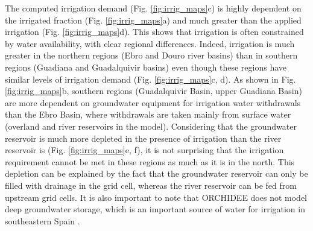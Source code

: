 The computed irrigation demand (Fig. \ref{fig:irrig_maps}c) is highly dependent on the irrigated fraction (Fig. \ref{fig:irrig_maps}a) and much greater than the applied irrigation (Fig. \ref{fig:irrig_maps}d). This shows that irrigation is often constrained by water availability, with clear regional differences. Indeed, irrigation is much greater in the northern regions (Ebro and Douro river basins) than in southern regions (Guadiana and Guadalquivir basins) even though these regions have similar levels of irrigation demand (Fig. \ref{fig:irrig_maps}c, d).
As shown in Fig. \ref{fig:irrig_maps}b, southern regions (Guadalquivir Basin, upper Guadiana Basin) are more dependent on groundwater equipment for irrigation water withdrawals than the Ebro Basin, where withdrawals are taken mainly from surface water (overland and river reservoirs in the model).
Considering that the groundwater reservoir is much more depleted in the presence of irrigation than the river reservoir is (Fig. \ref{fig:irrig_maps}e, f), it is not surprising that the irrigation requirement cannot be met in these regions as much as it is in the north.
This depletion can be explained by the fact that the groundwater reservoir can only be filled with drainage in the grid cell, whereas the river reservoir can be fed from upstream grid cells. It is also important to note that ORCHIDEE does not model deep groundwater storage, which is an important source of water for irrigation in southeastern Spain \citep{custodio_groundwater_2016}.

